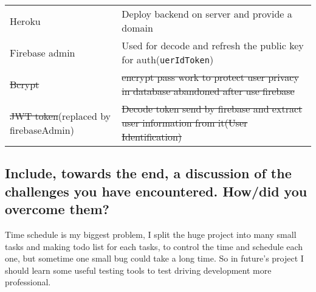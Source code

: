 \documentclass[
  paper=a4,
  ,captions=tableheading
]{scrartcl}
\begin{document}
\begin{longtable}[]{@{}ll@{}}
\begin{minipage}[t]{0.29\columnwidth}\raggedright
Heroku\strut
\end{minipage} & \begin{minipage}[t]{0.65\columnwidth}\raggedright
Deploy backend on server and provide a domain\strut
\end{minipage}\tabularnewline
\begin{minipage}[t]{0.29\columnwidth}\raggedright
Firebase admin\strut
\end{minipage} & \begin{minipage}[t]{0.65\columnwidth}\raggedright
Used for decode and refresh the public key for
auth(\texttt{uerIdToken})\strut
\end{minipage}\tabularnewline
\begin{minipage}[t]{0.29\columnwidth}\raggedright
\sout{Bcrypt}\strut
\end{minipage} & \begin{minipage}[t]{0.65\columnwidth}\raggedright
\sout{encrypt pass work to protect user privacy in database abandoned
after use firebase}\strut
\end{minipage}\tabularnewline
\begin{minipage}[t]{0.29\columnwidth}\raggedright
\sout{JWT token}(replaced by firebaseAdmin)\strut
\end{minipage} & \begin{minipage}[t]{0.65\columnwidth}\raggedright
\sout{Decode token send by firebase and extract user information from
it(User Identification)}\strut
\end{minipage}\tabularnewline
\bottomrule
\end{longtable}

\hypertarget{include-towards-the-end-a-discussion-of-the-challenges-you-have-encountered.-howdid-you-overcome-them}{%
\subsection{Include, towards the end, a discussion of the challenges you
have encountered. How/did you overcome
them?}\label{include-towards-the-end-a-discussion-of-the-challenges-you-have-encountered.-howdid-you-overcome-them}}

Time schedule is my biggest problem, I split the huge project into many
small tasks and making todo list for each tasks, to control the time and
schedule each one, but sometime one small bug could take a long time. So
in future's project I should learn some useful testing tools to test
driving development more professional.
\end{document}
